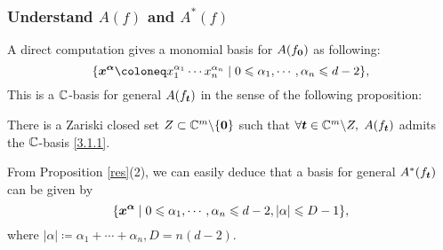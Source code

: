 \subsubsection{Understand \texorpdfstring{$A(f)$}{A(f)} and $A^*(f)$}
A direct computation gives a monomial basis for $A(f_{\boldsymbol 0})$ as following:
\begin{equation}\label{3.1.1}
  \{\xn^{\boldsymbol{\alpha}}\coloneq  x_1^ {\alpha_1}\cdots x_n^{\alpha_n}  \mid 0 \leqslant \alpha_1,\cdots, \alpha_n \leqslant d-2 \},
\end{equation}
This is a ${\mathbb{C}}$-basis for general $A(f_{\boldsymbol t})$ in the sense of the following proposition:
\begin{proposition} \label{pro-3.1}
  There is a Zariski closed set $Z\subset {\mathbb{C}}^m\backslash \{{\boldsymbol 0}\}$ such that $\forall {\boldsymbol t} \in {\mathbb{C}}^m\backslash Z,$ $A(f_{\boldsymbol t})$ admits the ${\mathbb{C}}$-basis \eqref{3.1.1}.
\end{proposition}	
\begin{remark}
  From Proposition \ref{res}(2), we can easily deduce that a basis for general $A^*(f_{\boldsymbol t})$ can be given by 
  \[\{{\boldsymbol{x}}^{\boldsymbol{\alpha}} \mid 0 \leqslant \alpha _1,\cdots, \alpha_n \leqslant d-2 , |\alpha|\leqslant D-1\},\]
  where $|\alpha|\coloneq \alpha_1+\cdots+\alpha_n, D= n(d-2).$
\end{remark}
